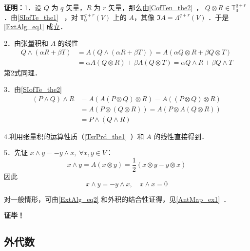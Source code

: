 \textbf{证明：}1．设 $Q$ 为 $q$ 矢量，$R$ 为 $r$ 矢量，那么由\autoref{CofTen_the2}~， $Q\otimes R\in\mathbb T_0^{q+r}$ ．由\autoref{SIofTe_the1}~ ，对 $\mathbb T_0^{q+r}(V)$ 上的 $A$，其像 $\Im A=\Lambda ^{q+r}(V)$ ．于是\autoref{ExtAlg_eq1} 成立．

2．由张量积和 $A$ 的线性
\begin{equation}
\begin{aligned}
Q\wedge(\alpha R+\beta T)&=A(Q\wedge(\alpha R+\beta T))=A(\alpha Q\otimes R+\beta Q\otimes T)\\
&=\alpha A(Q\otimes R)+\beta A(Q\otimes T)=\alpha Q\wedge R+\beta Q\wedge T
\end{aligned}
\end{equation}
第2式同理．

3．由\autoref{SIofTe_the2}~
\begin{equation}
\begin{aligned}
(P\wedge Q)\wedge R&=A(A(P\otimes Q)\otimes R)=A((P\otimes Q)\otimes R)\\
&=A(P\otimes (Q\otimes R))=A(P\otimes A(Q\otimes R))\\
&=P\wedge (Q\wedge R)
\end{aligned}
\end{equation}

4.利用张量积的运算性质（\autoref{TsrPrd_the1}~）和 $A$ 的线性直接得到．

5．先证 $x\wedge y=-y\wedge x,\;\forall x,y\in V$：
\begin{equation}
x\wedge y=A(x\otimes y)=\frac{1}{2}(x\otimes y-y\otimes x)
\end{equation}
因此
\begin{equation}\label{ExtAlg_eq2}
x\wedge y=-y\wedge x,\quad x\wedge x=0
\end{equation}

对一般情形，可由\autoref{ExtAlg_eq2} 和外积的结合性证得，见\autoref{AntMap_ex1}~．

\textbf{证毕！}

\subsection{外代数}

